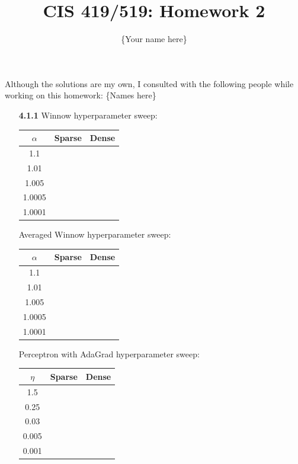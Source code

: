 \documentclass{article}
\title{CIS 419/519: Homework 2}
\author{\{Your name here\}}
\date{}
\begin{document}
\maketitle
    Although the solutions are my own, I consulted with the following people while working on this homework: \{Names here\} \\

\begin{enumerate}
    \item[\textbf{4.1.1}]
    Winnow hyperparameter sweep:
    \begin{center}
        \begin{tabular}{|c|c|c|}
            \hline
            $\alpha$ & Sparse & Dense \\
            \hline
            1.1 & & \\
            1.01 & & \\
            1.005 & & \\
            1.0005 & & \\
            1.0001 & & \\
            \hline
        \end{tabular}
    \end{center}

    Averaged Winnow hyperparameter sweep:
    \begin{center}
        \begin{tabular}{|c|c|c|}
            \hline
            $\alpha$ & Sparse & Dense \\
            \hline
            1.1 & & \\
            1.01 & & \\
            1.005 & & \\
            1.0005 & & \\
            1.0001 & & \\
            \hline
        \end{tabular}
    \end{center}

    Perceptron with AdaGrad hyperparameter sweep:
    \begin{center}
        \begin{tabular}{|c|c|c|}
            \hline
            $\eta$ & Sparse & Dense \\
            \hline
            1.5 & & \\
            0.25 & & \\
            0.03 & & \\
            0.005 & & \\
            0.001 & & \\
            \hline
        \end{tabular}
    \end{center}


\end{enumerate}
\end{document}
